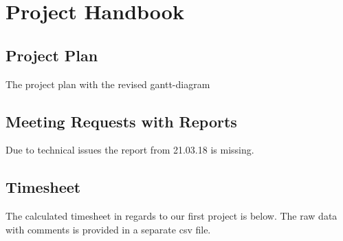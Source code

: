
\chapter{Project Handbook}
\label{appendix:projecthandbook}

\section{Project Plan}
The project plan with the revised gantt-diagram



\section{Meeting Requests with Reports}
Due to technical issues the report from 21.03.18 is missing.





\section{Timesheet}
The calculated timesheet in regards to our first project is below. The raw data with comments is provided in a separate csv file.






